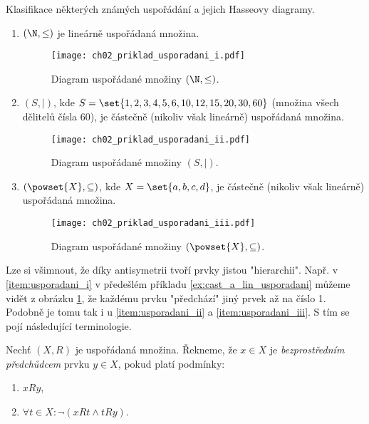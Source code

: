 \begin{example}\label{ex:cast_a_lin_usporadani}
    Klasifikace některých známých uspořádání a jejich Hasseovy diagramy.
    \begin{enumerate}[label=(\roman*)]
        \item\label{item:usporadani_i} $(\N,\leq)$ je lineárně uspořádaná množina.
        \begin{figure}[H]
            \centering
            \texttt{[image: ch02\_priklad\_usporadani\_i.pdf]}
            \caption{Diagram uspořádané množiny $(\N,\leq)$.}
            \label{fig:priklad_usporadani_i}
        \end{figure}
        \item\label{item:usporadani_ii} $(S,\mid)$, kde $S=\set{1, 2, 3, 4, 5, 6, 10, 12, 15, 20, 30, 60}$ (množina všech dělitelů čísla 60), je částečně (nikoliv však lineárně) uspořádaná množina.
        \begin{figure}[H]
            \centering
            \texttt{[image: ch02\_priklad\_usporadani\_ii.pdf]}
            \caption{Diagram uspořádané množiny $(S,\mid)$.}
            \label{fig:priklad_usporadani_ii}
        \end{figure}
        \item\label{item:usporadani_iii} $(\powset{X}, \subseteq)$, kde $X=\set{a,b,c,d}$, je částečně (nikoliv však lineárně) uspořádaná množina.
        \begin{figure}[H]
            \centering
            \texttt{[image: ch02\_priklad\_usporadani\_iii.pdf]}
            \caption{Diagram uspořádané množiny $(\powset{X}, \subseteq)$.}
            \label{fig:priklad_usporadani_iii}
        \end{figure}
    \end{enumerate}
\end{example}
Lze si všimnout, že díky antisymetrii tvoří prvky jistou "hierarchii". Např. v \ref{item:usporadani_i} v předešlém příkladu \ref{ex:cast_a_lin_usporadani} můžeme vidět z obrázku \ref{fig:priklad_usporadani_i}, že každému prvku "předchází" jiný prvek až na číslo 1. Podobně je tomu tak i u \ref{item:usporadani_ii} a \ref{item:usporadani_iii}. S tím se pojí následující terminologie.
\begin{definition}\label{def:predchudce}
    Nechť $(X,R)$ je uspořádaná množina. Řekneme, že $x\in X$ je \emph{bezprostředním předchůdcem} prvku $y\in X$, pokud platí podmínky:
    \begin{enumerate}[label=(\roman*)]
        \item $xRy$,
        \item $\forall t\in X: \neg(xRt \land tRy)$.
    \end{enumerate}
\end{definition}
